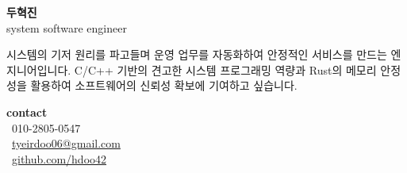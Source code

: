 \documentclass[10pt, a4paper]{article}
\newcommand{\descstyle}{\lightfont\fontsize{9.5pt}{10pt}\selectfont}
\begin{document}
\pagestyle{empty}

\noindent
\begin{minipage}[t]{0.61 \textwidth} 
    {\huge\bfseries 두혁진} \\[0.5em]
    {\Large\textcolor{bonusSteelBlue}{system software engineer}} 
    \vspace{0.8em}
    
    {\descstyle 
    시스템의 기저 원리를 파고들며 운영 업무를 자동화하여 안정적인 서비스를 만드는 엔지니어입니다.
    C/C++ 기반의 견고한 시스템 프로그래밍 역량과 Rust의 메모리 안정성을 활용하여 
    소프트웨어의 신뢰성 확보에 기여하고 싶습니다.}
\end{minipage}%
\hfill
\begin{minipage}[t]{0.28\textwidth} 
    {\huge\bfseries contact} \\
    {\descstyle
    \faPhone \ 010-2805-0547 \\
    \faEnvelope \ \href{mailto:tyeirdoo06@gmail.com}{tyeirdoo06@gmail.com} \\
    \faGithub \ \href{https://github.com/hdoo42}{github.com/hdoo42}
    }
\end{minipage}

\vspace{1.5em} %
\end{document}

